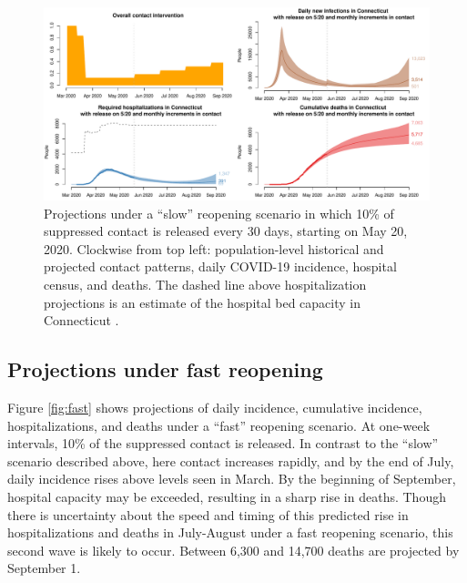 \documentclass[11pt]{article}
\begin{document}
\begin{figure}
\centering
\includegraphics[width=\textwidth]{figures/slow.pdf}
\caption{Projections under a ``slow'' reopening scenario in which 10\% of suppressed contact is released every 30 days, starting on May 20, 2020. Clockwise from top left: population-level historical and projected contact patterns, daily COVID-19 incidence, hospital census, and deaths. The dashed line above hospitalization projections is an estimate of the hospital bed capacity in Connecticut \citep{CHAwebsite}. }

\label{fig:slow}
\end{figure}



\subsection*{Projections under fast reopening} 

Figure \ref{fig:fast} shows projections of daily incidence, cumulative incidence, hospitalizations, and deaths under a ``fast'' reopening scenario. At one-week intervals, 10\% of the suppressed contact is released.   In contrast to the ``slow'' scenario described above, here contact increases rapidly, and by the end of July, daily incidence rises above levels seen in March.  By the beginning of September, hospital capacity may be exceeded, resulting in a sharp rise in deaths.  Though there is uncertainty about the speed and timing of this predicted rise in hospitalizations and deaths in July-August under a fast reopening scenario, this second wave is likely to occur. Between 6,300 and 14,700 deaths are projected by September 1.  
\end{document}

